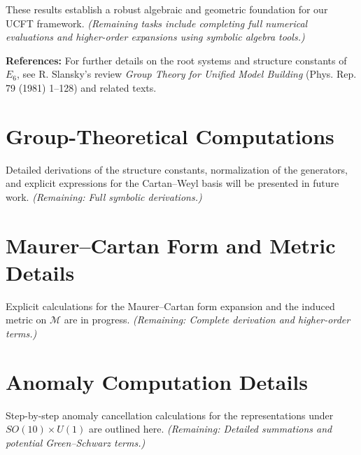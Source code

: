 \documentclass[aps,prd,preprint,groupedaddress]{revtex4-2}
\begin{document}
These results establish a robust algebraic and geometric foundation for our UCFT framework. \emph{(Remaining tasks include completing full numerical evaluations and higher-order expansions using symbolic algebra tools.)}

\bigskip
\noindent \textbf{References:} For further details on the root systems and structure constants of \(E_6\), see R. Slansky's review \emph{Group Theory for Unified Model Building} (Phys. Rep. 79 (1981) 1–128) and related texts.

\clearpage

\section{Group-Theoretical Computations}
\label{app:group}
Detailed derivations of the structure constants, normalization of the generators, and explicit expressions for the Cartan--Weyl basis will be presented in future work. \emph{(Remaining: Full symbolic derivations.)}

\section{Maurer--Cartan Form and Metric Details}
\label{app:mc}
Explicit calculations for the Maurer--Cartan form expansion and the induced metric on $\mathcal{M}$ are in progress. \emph{(Remaining: Complete derivation and higher-order terms.)}

\section{Anomaly Computation Details}
\label{app:anomaly}
Step-by-step anomaly cancellation calculations for the representations under $SO(10)\times U(1)$ are outlined here. \emph{(Remaining: Detailed summations and potential Green--Schwarz terms.)}



\end{document}
